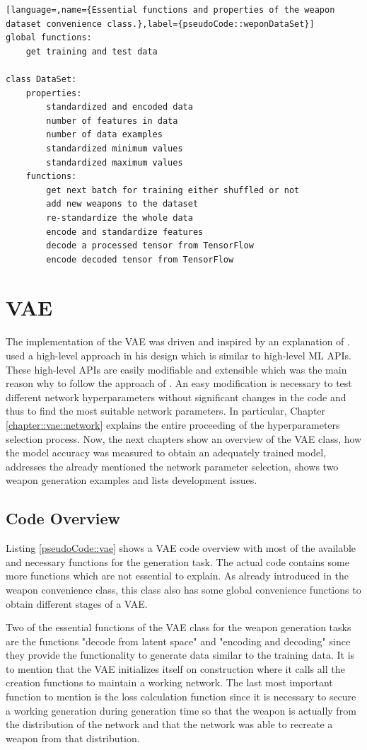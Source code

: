 \documentclass[MGS,Master,english]{twbook}%
\begin{document}
\begin{lstlisting}[language=,name={Essential functions and properties of the weapon dataset convenience class.},label={pseudoCode::weponDataSet}]
global functions:
	get training and test data
	
class DataSet:
	properties:
		standardized and encoded data
		number of features in data
		number of data examples
		standardized minimum values
		standardized maximum values 
	functions:
		get next batch for training either shuffled or not
		add new weapons to the dataset
		re-standardize the whole data
		encode and standardize features
		decode a processed tensor from TensorFlow
		encode decoded tensor from TensorFlow
\end{lstlisting}

\section{\acl{VAE}}
The implementation of the VAE was driven and inspired by an explanation of \citep{tutorial::vaeTF}.  used a high-level approach in his design which is similar to high-level ML APIs. These high-level APIs are easily modifiable and extensible which was the main reason why to follow the approach of . An easy modification is necessary to test different network hyperparameters without significant changes in the code and thus to find the most suitable network parameters. In particular, Chapter \ref{chapter::vae::network} explains the entire proceeding of the hyperparameters selection process. Now, the next chapters show an overview of the VAE class, how the model accuracy was measured to obtain an adequately trained model, addresses the already mentioned the network parameter selection, shows two weapon generation examples and lists development issues.

\subsection{Code Overview}
Listing \ref{pseudoCode::vae} shows a VAE code overview with most of the available and necessary functions for the generation task. The actual code contains some more functions which are not essential to explain. As already introduced in the weapon convenience class, this class also has some global convenience functions to obtain different stages of a VAE. 

Two of the essential functions of the VAE class for the weapon generation tasks are the functions "decode from latent space" and "encoding and decoding" since they provide the functionality to generate data similar to the training data. It is to mention that the VAE initializes itself on construction where it calls all the creation functions to maintain a working network. The last most important function to mention is the loss calculation function since it is necessary to secure a working generation during generation time so that the weapon is actually from the distribution of the network and that the network was able to recreate a weapon from that distribution.
\end{document}

